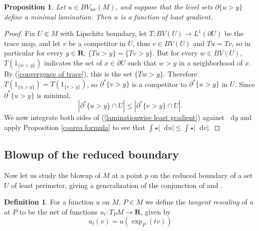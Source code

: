\documentclass[reqno,12pt,letterpaper]{amsart}
\newcommand{\RR}{\mathbf{R}}
\newcommand*\dif{\mathop{}\!\mathrm{d}}
\newcommand{\dfn}[1]{\emph{#1}\index{#1}}
\newcommand{\loc}{\mathrm{loc}}
\newtheorem{proposition}[theorem]{Proposition}
\theoremstyle{definition}
\newtheorem{definition}[theorem]{Definition}
\numberwithin{equation}{section}
\begin{document}
\begin{proposition}\label{minimal bounding implies least gradient}
Let $u \in BV_\loc(M)$, and suppose that the level sets $\partial \{u > y\}$ define a minimal lamination.
Then $u$ is a function of least gradient.
\end{proposition}
\begin{proof}
Fix $U \Subset M$ with Lipschitz boundary, let $T: BV(U) \to L^1(\partial U)$ be the trace map, and let $v$ be a competitor in $U$, thus $v \in BV(U)$ and $Tu = Tv$, so in particular for every $y \in \RR$, $\{Tu > y\} = \{Tv > y\}$.
But for every $w \in BV(U)$, $T(1_{\{w > y\}})$ indicates the set of $x \in \partial U$ such that $w > y$ in a neighborhood of $x$.
By (\ref{convergence of trace}), this is the set $\{Tw > y\}$.
Therefore $T(1_{\{u > y\}}) = T(1_{\{v > y\}})$, so $\partial^* \{v > y\}$ is a competitor to $\partial^* \{u > y\}$ in $U$.
Since $\partial^* \{u > y\}$ is minimal,
\begin{equation}\label{laminationwise least gradient}
|\partial^* \{u > y\} \cap U| \leq |\partial^* \{v > y\} \cap U|.
\end{equation}
We now integrate both sides of (\ref{laminationwise least gradient}) against $\dif y$ and apply Proposition \ref{coarea formula} to see that $\int \star |\dif u| \leq \int \star |\dif v|$.
\end{proof}


\subsection{Blowup of the reduced boundary}
Now let us study the blowup of $M$ at a point $p$ on the reduced boundary of a set $U$ of least perimeter, giving a generalization of the conjunction of \cite[Theorem 9.3]{Giusti77} and \cite[Theorem 6.2.2]{Simons68}.

\begin{definition}
For a function $u$ on $M$, $P \in M$ we define the \dfn{tangent rescaling} of $u$ at $P$ to be the net of functions $u_t: T_PM \to \RR$, given by
$$u_t(v) = u\left(\exp_P(tv)\right)$$
\end{definition}
\end{document}
